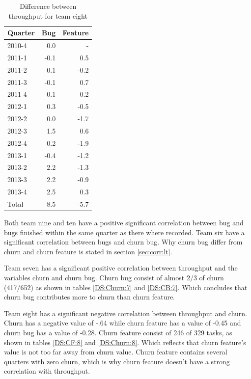 \documentclass[UKenglish]{ifimaster}  %
\begin{document}
\begin{table}[!htbp]
 \centering
 \begin{tabular}{|l |r|r|}
 \hline 
Quarter &Bug & Feature \\ \hline
2010-4&0.0 & - \\ \hline
2011-1&-0.1 & 0.5\\ \hline
2011-2&0.1 & -0.2\\ \hline
2011-3&-0.1 & 0.7\\ \hline
2011-4&0.1 & -0.2\\ \hline
2012-1&0.3 & -0.5\\ \hline
2012-2&0.0 & -1.7\\ \hline
2012-3&1.5 & 0.6\\ \hline
2012-4&0.2 & -1.9\\ \hline
2013-1&-0.4 & -1.2\\ \hline
2013-2&2.2 & -1.3\\ \hline
2013-3&2.2 & -0.9\\ \hline
2013-4&2.5 & 0.3\\ \hline
Total &  8.5&-5.7 \\ \hline
\end{tabular}
 \caption{Difference between throughput for team eight}
 \label{DS:Difference}
 \end{table}

Both team nine and ten have a positive significant correlation between bug and bugs finished within the same quarter as there where recorded. Team six have a significant correlation between bugs and churn bug. Why churn bug differ from churn and churn feature is stated in section \ref{sec:corr:lt}. 

Team seven has a significant positive correlation between throughput and the variables churn and churn bug. Churn bug consist of almost 2/3 of churn (417/652) as shown in tables \ref{DS:Churn:7} and \ref{DS:CB:7}. Which concludes that churn bug contributes more to churn than churn feature.

Team eight has a significant negative correlation between throughput and churn. Churn has a negative value of -.64 while churn feature has a value of -0.45 and churn bug has a value of -0.28. Churn feature consist of 246 of 329 tasks, as shown in tables \ref{DS:CF:8} and \ref{DS:Churn:8}. Which reflects that churn feature's value is not too far away from churn value. Churn feature contains several quarters with zero churn, which is why churn feature doesn't have a strong correlation with throughput. 
\end{document}
